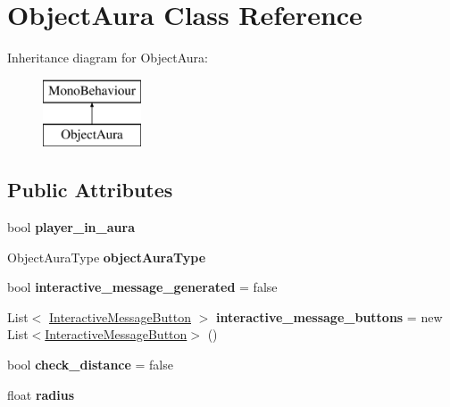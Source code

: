 \hypertarget{class_object_aura}{}\section{Object\+Aura Class Reference}
\label{class_object_aura}
Inheritance diagram for Object\+Aura\+:\begin{figure}[H]
\begin{center}
\leavevmode
\includegraphics[height=2.000000cm]{class_object_aura}
\end{center}
\end{figure}
\subsection*{Public Attributes}
\begin{DoxyCompactItemize}
\item 
\mbox{\label{class_object_aura_a8a40c5c9b02bb48f5934154baf5a8087}} 
bool {\bfseries player\+\_\+in\+\_\+aura}
\item 
\mbox{\label{class_object_aura_a50640a47a2757545614081176cf57816}} 
Object\+Aura\+Type {\bfseries object\+Aura\+Type}
\item 
\mbox{\label{class_object_aura_a4b9a0fff7f66a23a37cef92e5bd3db26}} 
bool {\bfseries interactive\+\_\+message\+\_\+generated} = false
\item 
\mbox{\label{class_object_aura_a337f83b23b4547f0719d2b3146391a97}} 
List$<$ \hyperlink{class_interactive_message_button}{Interactive\+Message\+Button} $>$ {\bfseries interactive\+\_\+message\+\_\+buttons} = new List$<$\hyperlink{class_interactive_message_button}{Interactive\+Message\+Button}$>$ ()
\item 
\mbox{\label{class_object_aura_a68d5255fca157109649b8b19aeffbd17}} 
bool {\bfseries check\+\_\+distance} = false
\item 
\mbox{\label{class_object_aura_a3b940ca33764a9a82af38b4dff1fe600}} 
float {\bfseries radius}
\end{DoxyCompactItemize}
